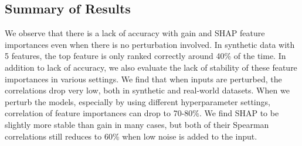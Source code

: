  

\vspace{-.3cm}
\subsection{Summary of Results}
\label{results:summary}
We observe that there is a lack of accuracy with gain and SHAP feature importances even when there is no perturbation involved. In synthetic data with 5 features, the top feature is only ranked correctly around 40\% of the time. In addition to lack of accuracy, we also evaluate the lack of stability of these feature importances in various settings. %
We find that when inputs are perturbed, the correlations drop very low, both in synthetic and real-world datasets. When we perturb the models, especially by using different hyperparameter settings, correlation of feature importances can drop to 70-80\%. We find SHAP to be slightly more stable than gain in many cases, but both of their Spearman correlations still reduces to 60\% when low noise is added to the input.

